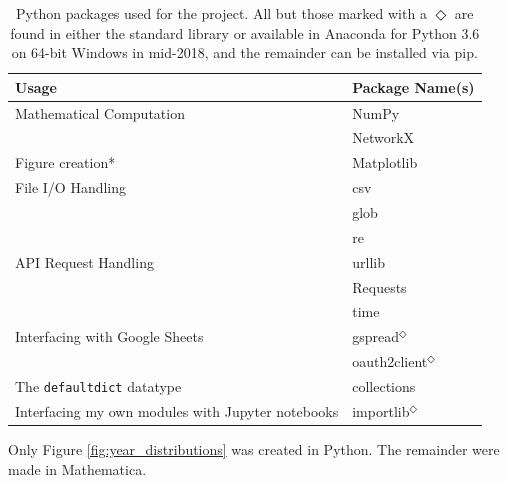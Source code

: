 \documentclass[12pt]{thesis}
\theoremstyle{plain}
\theoremstyle{definition}
\theoremstyle{remark}
\begin{document}

\begin{table}[t]
\centering
\setlength\extrarowheight{1.5pt}
\begin{tabular}{| l | l |}
\hline
\textbf{Usage} & \textbf{Package Name(s)} \\ \hline\hline
Mathematical Computation & NumPy \\
& NetworkX \\
\hline
Figure creation* & Matplotlib \\ 
\hline
File I/O Handling & csv\\ 
& glob \\
& re \\
\hline
API Request Handling  & urllib \\
& Requests \\ 
& time \\
\hline
Interfacing with Google Sheets & gspread$^\Diamond$ \\
& oauth2client$^\Diamond$ \\
\hline
The \verb+defaultdict+ datatype & collections \\
\hline
Interfacing my own modules with Jupyter notebooks & importlib$^\Diamond$ \\ 
\hline
\end{tabular}
\caption{Python packages used for the project. All but those marked with a $\Diamond$ are found in either the standard library or available in Anaconda for Python 3.6 on 64-bit Windows in mid-2018, and the remainder can be installed via pip.}
\footnotesize *Only Figure \ref{fig:year_distributions} was created in Python. The remainder were made in Mathematica.
\label{tab:python_packages}
\end{table}
\end{document}
